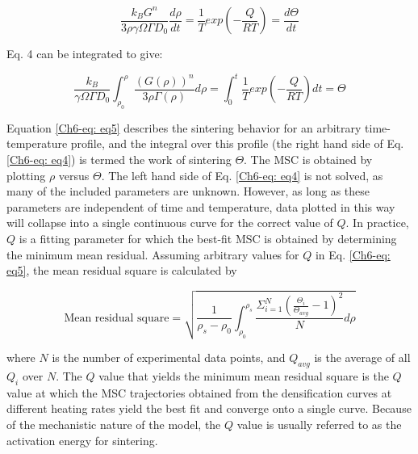 \begin{equation}
\label{Ch6-eq: eq4}
\frac{k_{B} G^{n}}{3 \rho \gamma \Omega \Gamma D_{0}} \frac{d\rho}{dt} = \frac{1}{T} exp \left( -\frac{Q}{RT} \right) = \frac{d \Theta}{dt}
\end{equation}

\noindent Eq. 4 can be integrated to give:

\begin{equation}
\label{Ch6-eq: eq5}
\frac{k_{B} }{ \gamma \Omega \Gamma D_{0}} \int_{\rho_{0}}^{\rho} \frac{(G(\rho))^{n}}{3 \rho \Gamma (\rho)} d \rho = \int_{0}^{t} \frac{1}{T} exp \left( -\frac{Q}{RT} \right) dt = \Theta
\end{equation}

\noindent Equation \ref{Ch6-eq: eq5} describes the sintering behavior for an arbitrary time-temperature profile, and the integral over this profile (the right hand side of Eq. \ref{Ch6-eq: eq4}) is termed the work of sintering $\Theta$. The MSC is obtained by plotting $\rho$ versus $\Theta$. The left hand side of Eq. \ref{Ch6-eq: eq4} is not solved, as many of the included parameters are unknown. However, as long as these parameters are independent of time and temperature, data plotted in this way will collapse into a single continuous curve for the correct value of $Q$. In practice, $Q$ is a fitting parameter for which the best-fit MSC is obtained by determining the minimum mean residual. Assuming arbitrary values for $Q$ in Eq. \ref{Ch6-eq: eq5}, the mean residual square is calculated by \cite{Blaine2009,Blaine2006,Shao2009a}

\begin{equation}
\label{Ch6-eq: eq6}
\mbox{Mean residual square} = \sqrt{\frac{1}{\rho_{s}-\rho_{0}}\int_{\rho_{0}}^{\rho_{s}} \frac{\Sigma_{i=1}^{N} \left( \frac{\Theta_{i}}{\Theta_{avg}}-1 \right)^{2}}{N} d\rho}
\end{equation}

\noindent where $N$ is the number of experimental data points, and $Q_{avg}$ is the average of all $Q_{i}$ over $N$. The $Q$ value that yields the minimum mean residual square is the $Q$ value at which the MSC trajectories obtained from the densification curves at different heating rates yield the best fit and converge onto a single curve.  Because of the mechanistic nature of the model, the $Q$ value is usually referred to as the activation energy for sintering.

